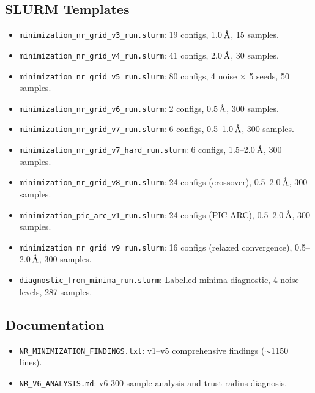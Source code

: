 \documentclass[11pt,a4paper]{article}
\newcommand{\angstrom}{\text{\r{A}}}
\begin{document}
\subsection{SLURM Templates}

\begin{itemize}
  \item \texttt{minimization\_nr\_grid\_v3\_run.slurm}: 19 configs, 1.0\,$\angstrom$, 15 samples.
  \item \texttt{minimization\_nr\_grid\_v4\_run.slurm}: 41 configs, 2.0\,$\angstrom$, 30 samples.
  \item \texttt{minimization\_nr\_grid\_v5\_run.slurm}: 80 configs, 4 noise $\times$ 5 seeds, 50 samples.
  \item \texttt{minimization\_nr\_grid\_v6\_run.slurm}: 2 configs, 0.5\,$\angstrom$, 300 samples.
  \item \texttt{minimization\_nr\_grid\_v7\_run.slurm}: 6 configs, 0.5--1.0\,$\angstrom$, 300 samples.
  \item \texttt{minimization\_nr\_grid\_v7\_hard\_run.slurm}: 6 configs, 1.5--2.0\,$\angstrom$, 300 samples.
  \item \texttt{minimization\_nr\_grid\_v8\_run.slurm}: 24 configs (crossover), 0.5--2.0\,$\angstrom$, 300 samples.
  \item \texttt{minimization\_pic\_arc\_v1\_run.slurm}: 24 configs (PIC-ARC), 0.5--2.0\,$\angstrom$, 300 samples.
  \item \texttt{minimization\_nr\_grid\_v9\_run.slurm}: 16 configs (relaxed convergence), 0.5--2.0\,$\angstrom$, 300 samples.
  \item \texttt{diagnostic\_from\_minima\_run.slurm}: Labelled minima diagnostic, 4 noise levels, 287 samples.
\end{itemize}

\subsection{Documentation}

\begin{itemize}
  \item \texttt{NR\_MINIMIZATION\_FINDINGS.txt}: v1--v5 comprehensive findings ($\sim$1150 lines).
  \item \texttt{NR\_V6\_ANALYSIS.md}: v6 300-sample analysis and trust radius diagnosis.
\end{itemize}
\end{document}

